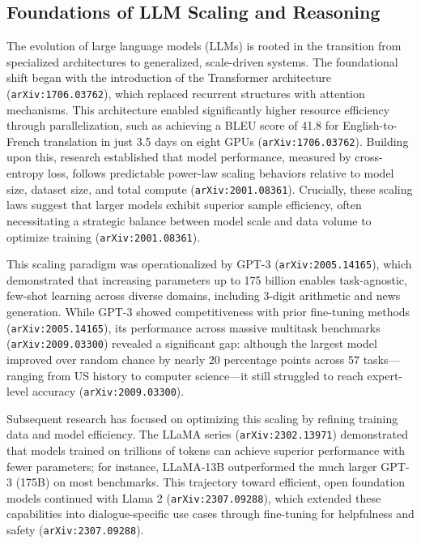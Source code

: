 \documentclass[11pt]{article}
\begin{document}
\subsection{Foundations of LLM Scaling and Reasoning}

The evolution of large language models (LLMs) is rooted in the transition from specialized architectures to generalized, scale-driven systems. The foundational shift began with the introduction of the Transformer architecture (\texttt{arXiv:1706.03762}), which replaced recurrent structures with attention mechanisms. This architecture enabled significantly higher resource efficiency through parallelization, such as achieving a BLEU score of 41.8 for English-to-French translation in just 3.5 days on eight GPUs (\texttt{arXiv:1706.03762}). Building upon this, research established that model performance, measured by cross-entropy loss, follows predictable power-law scaling behaviors relative to model size, dataset size, and total compute (\texttt{arXiv:2001.08361}). Crucially, these scaling laws suggest that larger models exhibit superior sample efficiency, often necessitating a strategic balance between model scale and data volume to optimize training (\texttt{arXiv:2001.08361}).

This scaling paradigm was operationalized by GPT-3 (\texttt{arXiv:2005.14165}), which demonstrated that increasing parameters up to 175 billion enables task-agnostic, few-shot learning across diverse domains, including 3-digit arithmetic and news generation. While GPT-3 showed competitiveness with prior fine-tuning methods (\texttt{arXiv:2005.14165}), its performance across massive multitask benchmarks (\texttt{arXiv:2009.03300}) revealed a significant gap: although the largest model improved over random chance by nearly 20 percentage points across 57 tasks—ranging from US history to computer science—it still struggled to reach expert-level accuracy (\texttt{arXiv:2009.03300}).

Subsequent research has focused on optimizing this scaling by refining training data and model efficiency. The LLaMA series (\texttt{arXiv:2302.13971}) demonstrated that models trained on trillions of tokens can achieve superior performance with fewer parameters; for instance, LLaMA-13B outperformed the much larger GPT-3 (175B) on most benchmarks. This trajectory toward efficient, open foundation models continued with Llama 2 (\texttt{arXiv:2307.09288}), which extended these capabilities into dialogue-specific use cases through fine-tuning for helpfulness and safety (\texttt{arXiv:2307.09288}).
\end{document}
